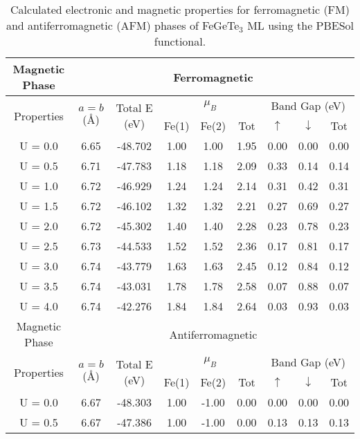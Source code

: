 \begin{table}[H]
	\centering
	\setlength{\extrarowheight}{0.5ex}
	\caption{Calculated electronic and magnetic properties for ferromagnetic (FM) and antiferromagnetic (AFM) phases of FeGeTe$_3$ ML using the PBESol functional.}
	\begin{tabular}{cccccc|ccc}
		\toprule
		\toprule
		\rowcolor{WhiteSmoke!70!Lavender}
		Magnetic Phase & \multicolumn{8}{c}{Ferromagnetic} \\
		\midrule
		\multirow{2}{*}{Properties} & \multirow{2}{*}{$a=b$ (\AA)} & \multirow{2}{*}{Total E (eV)} & \multicolumn{3}{c}{$\mu_{B}$} & \multicolumn{3}{c}{Band Gap (eV)} \\
		\cline{4-9}
		& & & Fe(1) & Fe(2) & Tot & $\uparrow$ & $\downarrow$ & Tot \\
		\midrule
		U = 0.0 & 6.65 & -48.702 & 1.00 & 1.00 & 1.95 & 0.00 & 0.00 & 0.00 \\
		U = 0.5 & 6.71 & -47.783 & 1.18 & 1.18 & 2.09 & 0.33 & 0.14 & 0.14 \\
		U = 1.0 & 6.72 & -46.929 & 1.24 & 1.24 & 2.14 & 0.31 & 0.42 & 0.31 \\
		U = 1.5 & 6.72 & -46.102 & 1.32 & 1.32 & 2.21 & 0.27 & 0.69 & 0.27 \\
		U = 2.0 & 6.72 & -45.302 & 1.40 & 1.40 & 2.28 & 0.23 & 0.78 & 0.23 \\
		U = 2.5 & 6.73 & -44.533 & 1.52 & 1.52 & 2.36 & 0.17 & 0.81 & 0.17 \\
		U = 3.0 & 6.74 & -43.779 & 1.63 & 1.63 & 2.45 & 0.12 & 0.84 & 0.12 \\
		U = 3.5 & 6.74 & -43.031 & 1.78 & 1.78 & 2.58 & 0.07 & 0.88 & 0.07 \\
		U = 4.0 & 6.74 & -42.276 & 1.84 & 1.84 & 2.64 & 0.03 & 0.93 & 0.03 \\
		\midrule
		\rowcolor{WhiteSmoke!70!Lavender}
		Magnetic Phase & \multicolumn{8}{c}{Antiferromagnetic} \\
		\midrule
		\multirow{2}{*}{Properties} & \multirow{2}{*}{$a=b$ (\AA)} & \multirow{2}{*}{Total E (eV)} & \multicolumn{3}{c}{$\mu_{B}$} & \multicolumn{3}{c}{Band Gap (eV)} \\
		\cline{4-9}
		& & & Fe(1) & Fe(2) & Tot & $\uparrow$ & $\downarrow$ & Tot \\
		\midrule
		U = 0.0 & 6.67 & -48.303 & 1.00 & -1.00 & 0.00 & 0.00 & 0.00 & 0.00 \\
		U = 0.5 & 6.67 & -47.386 & 1.00 & -1.00 & 0.00 & 0.13 & 0.13 & 0.13 \\

\end{tabular}
\end{table}
